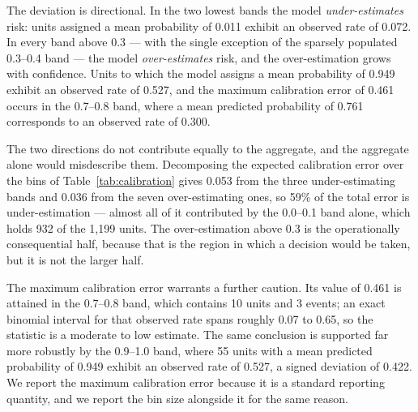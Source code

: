 \documentclass[sn-vancouver,Numbered]{sn-jnl}
\begin{document}
The deviation is directional. In the two lowest bands the model \emph{under-estimates} risk: units assigned a mean probability of 0.011 exhibit an observed rate of 0.072. In every band above 0.3 --- with the single exception of the sparsely populated 0.3--0.4 band --- the model \emph{over-estimates} risk, and the over-estimation grows with confidence. Units to which the model assigns a mean probability of 0.949 exhibit an observed rate of 0.527, and the maximum calibration error of 0.461 occurs in the 0.7--0.8 band, where a mean predicted probability of 0.761 corresponds to an observed rate of 0.300.

The two directions do not contribute equally to the aggregate, and the aggregate alone would misdescribe them. Decomposing the expected calibration error over the bins of Table~\ref{tab:calibration} gives 0.053 from the three under-estimating bands and 0.036 from the seven over-estimating ones, so 59\% of the total error is under-estimation --- almost all of it contributed by the 0.0--0.1 band alone, which holds 932 of the 1{,}199 units. The over-estimation above 0.3 is the operationally consequential half, because that is the region in which a decision would be taken, but it is not the larger half.

The maximum calibration error warrants a further caution. Its value of 0.461 is attained in the 0.7--0.8 band, which contains 10 units and 3 events; an exact binomial interval for that observed rate spans roughly 0.07 to 0.65, so the statistic is a moderate to low estimate. The same conclusion is supported far more robustly by the 0.9--1.0 band, where 55 units with a mean predicted probability of 0.949 exhibit an observed rate of 0.527, a signed deviation of 0.422. We report the maximum calibration error because it is a standard reporting quantity, and we report the bin size alongside it for the same reason.
\end{document}

